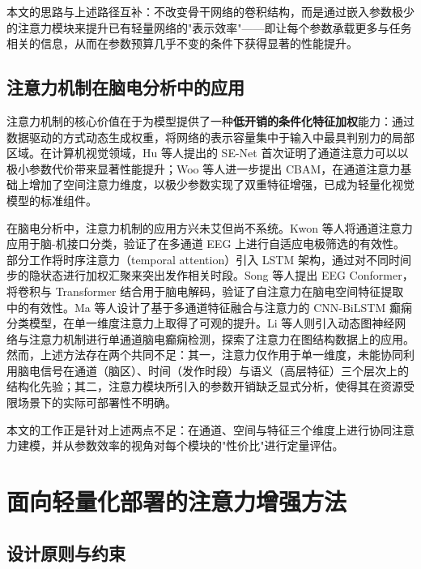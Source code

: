 \documentclass[12pt, a4paper]{article}
\begin{document}
本文的思路与上述路径互补：不改变骨干网络的卷积结构，而是通过嵌入参数极少的注意力模块来提升已有轻量网络的"表示效率"——即让每个参数承载更多与任务相关的信息，从而在参数预算几乎不变的条件下获得显著的性能提升。

\subsection{注意力机制在脑电分析中的应用}

注意力机制的核心价值在于为模型提供了一种\textbf{低开销的条件化特征加权}能力\cite{ref_vaswani2017}：通过数据驱动的方式动态生成权重，将网络的表示容量集中于输入中最具判别力的局部区域。在计算机视觉领域，Hu 等人\cite{ref_hu2018}提出的 SE-Net 首次证明了通道注意力可以以极小参数代价带来显著性能提升；Woo 等人\cite{ref_woo2018}进一步提出 CBAM，在通道注意力基础上增加了空间注意力维度，以极少参数实现了双重特征增强，已成为轻量化视觉模型的标准组件。

在脑电分析中，注意力机制的应用方兴未艾但尚不系统。Kwon 等人\cite{ref_kwon2020}将通道注意力应用于脑-机接口分类，验证了在多通道 EEG 上进行自适应电极筛选的有效性。部分工作将时序注意力（temporal attention）引入 LSTM 架构\cite{ref_tsiouris2018}，通过对不同时间步的隐状态进行加权汇聚来突出发作相关时段。Song 等人\cite{ref_song2023}提出 EEG Conformer，将卷积与 Transformer 结合用于脑电解码，验证了自注意力在脑电空间特征提取中的有效性。Ma 等人\cite{ref_ma2023}设计了基于多通道特征融合与注意力的 CNN-BiLSTM 癫痫分类模型，在单一维度注意力上取得了可观的提升。Li 等人\cite{ref_li2024}则引入动态图神经网络与注意力机制进行单通道脑电癫痫检测，探索了注意力在图结构数据上的应用。然而，上述方法存在两个共同不足：其一，注意力仅作用于单一维度，未能协同利用脑电信号在通道（脑区）、时间（发作时段）与语义（高层特征）三个层次上的结构化先验；其二，注意力模块所引入的参数开销缺乏显式分析，使得其在资源受限场景下的实际可部署性不明确。

本文的工作正是针对上述两点不足：在通道、空间与特征三个维度上进行协同注意力建模，并从参数效率的视角对每个模块的"性价比"进行定量评估。

\section{面向轻量化部署的注意力增强方法}

\subsection{设计原则与约束}
\end{document}
